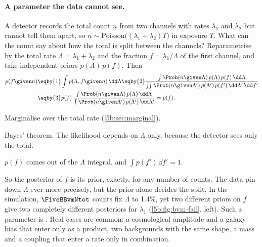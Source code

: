 \paragraph{A parameter the data cannot see.} A detector records the total count $n$ from
two channels with rates $\lambda_1$ and $\lambda_2$ but cannot tell them apart, so
$n\sim\text{Poisson}\bigl((\lambda_1+\lambda_2)T\bigr)$ in exposure $T$. What can the
count say about how the total is split between the channels? Reparametrise by the total
rate $\Lambda=\lambda_1+\lambda_2$ and the fraction $f=\lambda_1/\Lambda$ of the first
channel, and take independent priors $p(\Lambda)\,p(f)$. Then
\begin{align*}
  p(f\given n)
  &\eqby{1}\int p(\Lambda,f\given n)\,\dd\Lambda
   \eqby{2}\frac{\int\Prob(n\given\Lambda)\,p(\Lambda)\,p(f)\,\dd\Lambda}
               {\iint\Prob(n\given\Lambda')\,p(\Lambda')\,p(f')\,\dd\Lambda'\,\dd f'}
   \\
  &\eqby{3}p(f)\,\frac{\int\Prob(n\given\Lambda)\,p(\Lambda)\,\dd\Lambda}
               {\int\Prob(n\given\Lambda')\,p(\Lambda')\,\dd\Lambda'}
   =p(f).
\end{align*}
\begin{explain}
  \item Marginalise over the total rate (\cref{5b:sec:marginal}).
  \item Bayes' theorem. The likelihood depends on $\Lambda$ only, because the detector
        sees only the total.
  \item $p(f)$ comes out of the $\Lambda$ integral, and $\int p(f')\,\dd f'=1$.
\end{explain}
So the posterior of $f$ is its prior, exactly, for any number of counts. The data pin
down $\Lambda$ ever more precisely, but the prior alone decides the split. In the
simulation, $\FiveBBvmNtot$ counts fix $\Lambda$ to 1.4\%, yet two different priors on
$f$ give two completely different posteriors for $\lambda_1$ (\cref{5b:fig:bvm-fail},
left). Such a parameter is  . Real cases are common: a
cosmological amplitude and a galaxy bias that enter only as a product, two
backgrounds with the same shape, a mass and a coupling that enter a rate only in
combination.

